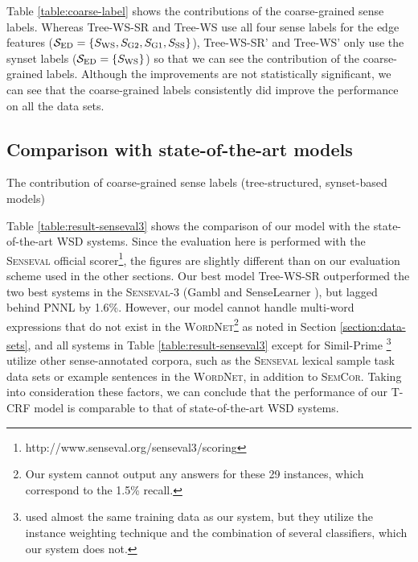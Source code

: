 \documentclass[english]{jnlp_1.4}
\begin{document}
Table \ref{table:coarse-label} shows the contributions of the coarse-grained sense labels.
Whereas Tree-WS-SR and Tree-WS use all four sense labels for the edge features (${\cal S}_{\mathrm{ED}} = \{ S_{\mathrm{WS}}, S_{\mathrm{G2}}, S_{\mathrm{G1}}, S_{\mathrm{SS}} \}$), Tree-WS-SR' and Tree-WS' only use the synset labels (${\cal S}_{\mathrm{ED}} = \{ S_{\mathrm{WS}} \} $) so that we can see the contribution of the coarse-grained labels.
Although the improvements are not statistically significant, we can see that the coarse-grained labels consistently did improve the performance on all the data sets.


\subsection{Comparison with state-of-the-art models}


\begin{table}[b]
\caption{The contribution of coarse-grained sense labels (tree-structured, synset-based models)}
\label{table:coarse-label}

\end{table} 
\begin{table}[b]
\label{table:result-senseval3}

\end{table}


Table \ref{table:result-senseval3} shows the comparison of our model with the state-of-the-art WSD systems.
Since the evaluation here is performed with the \textsc{Senseval} official scorer\footnote{http://www.senseval.org/senseval3/scoring}, the figures are slightly different than on our evaluation scheme used in the other sections.
Our best model Tree-WS-SR outperformed the two best systems in the \textsc{Senseval}-3 (Gambl \cite{decadt:2004} and SenseLearner \cite{mihalcea:2004}), but lagged behind PNNL \cite{tratz:2007} by 1.6\%.
However, our model cannot handle multi-word expressions that do not exist in the \textsc{WordNet}\footnote{Our system cannot output any answers for these 29 instances, which correspond to the 1.5\% recall.} as noted in Section \ref{section:data-sets}, and all systems in Table \ref{table:result-senseval3} except for Simil-Prime \cite{kohomban:2005}\footnote{\cite{kohomban:2005} used almost the same training data as our system, but they utilize the instance weighting technique and the combination of several classifiers, which our system does not.} utilize other sense-annotated corpora, such as the \textsc{Senseval} lexical sample task data sets or example sentences in the \textsc{WordNet}, in addition to \textsc{SemCor}.
Taking into consideration these factors, we can conclude that the performance of our T-CRF model is comparable to that of state-of-the-art WSD systems.
\end{document}
